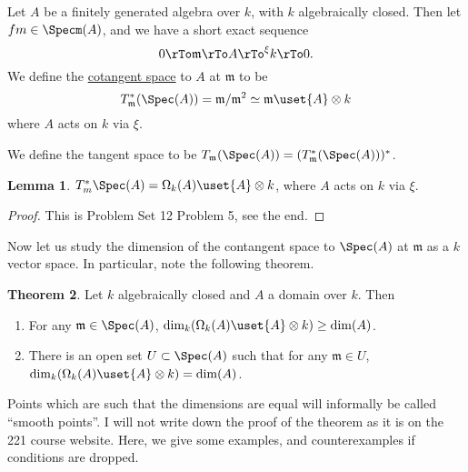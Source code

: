 \documentclass[12 pt]{article}
\theoremstyle{definition}
\newtheorem{theorem}{Theorem}[section]
\newtheorem{lemma}[theorem]{Lemma}
\begin{document}
\begin{definition}
Let $A$ be a finitely generated algebra over $k$, with $k$ algebraically closed. Then let $fm \in \Specm(A)$, and we have a short exact sequence
\[0 \rTo \mathfrak{m} \rTo A \rTo^\xi k \rTo 0.\] We define the \underline{cotangent space} to $A$ at $\mathfrak{m}$ to be
\[T_{\mathfrak{m}}^*(\Spec(A))=\mathfrak{m}/\mathfrak{m}^2 \simeq \mathfrak{m} \uset{A} \otimes k\]
where $A$ acts on $k$ via $\xi$.

We define the tangent space to be $T_\mathfrak{m}(\Spec(A))=(T_\mathfrak{m}^*(\Spec(A)))^*$.

\end{definition}

\begin{lemma} $T_m^*\Spec(A)=\Omega_k(A) \uset{A}\otimes k$, where $A$ acts on $k$ via $\xi$.
\end{lemma}
\begin{proof} This is Problem Set 12 Problem 5, see the end.
\end{proof}




Now let us study the dimension of the contangent space to $\Spec(A)$ at $\mathfrak{m}$ as a $k$ vector space. In particular, note the following theorem.
\begin{theorem} Let $k$ algebraically closed and $A$ a domain over $k$. Then
\begin{enumerate}
\item For any $\mathfrak{m} \in \Spec(A)$, $\dim_{k}(\Omega_k(A) \uset{A} \otimes k) \geq \dim(A)$.

\item There is an open set $U \subset \Spec(A)$ such that for any $\mathfrak{m} \in U$, $\dim_{k}(\Omega_k(A) \uset{A}\otimes k)=\dim(A)$.
\end{enumerate}
\label{dmn over alg clos k, exists open of smooths}
\end{theorem}

Points which are such that the dimensions are equal will informally be called ``smooth points''. I will not write down the proof of the theorem as it is on the 221 course website. Here, we give some examples, and counterexamples if conditions are dropped.
\end{document}
